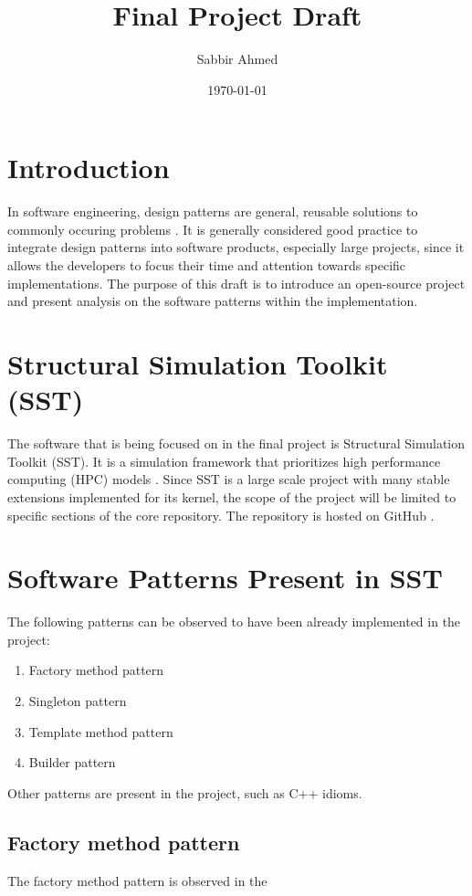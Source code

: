 \documentclass[titlepage]{article}
\title{Final Project Draft}
\author{Sabbir Ahmed}
\date{\today}
\begin{document}
\maketitle

\section{Introduction}
In software engineering, design patterns are general, reusable solutions to commonly occuring problems \cite{source-making}. It is generally considered good practice to integrate design patterns into software products, especially large projects, since it allows the developers to focus their time and attention towards specific implementations. The purpose of this draft is to introduce an open-source project and present analysis on the software patterns within the implementation.

\section{Structural Simulation Toolkit (SST)}
The software that is being focused on in the final project is Structural Simulation Toolkit (SST). It is a simulation framework that prioritizes high performance computing (HPC) models \cite{sst}. Since SST is a large scale project with many stable extensions implemented for its kernel, the scope of the project will be limited to specific sections of the core repository. The repository is hosted on GitHub \cite{sst-repo}.

\section{Software Patterns Present in SST}
The following patterns can be observed to have been already implemented in the project:
\begin{enumerate}
    \item Factory method pattern
    \item Singleton pattern
    \item Template method pattern
    \item Builder pattern
\end{enumerate}

Other patterns are present in the project, such as C++ idioms.

\subsection{Factory method pattern}
The factory method pattern is observed in the 
\end{document}
